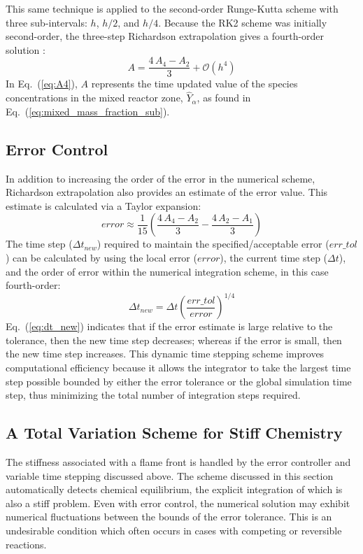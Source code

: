 This same technique is applied to the second-order Runge-Kutta scheme with three sub-intervals: $h$, $h/2$, and $h/4$. Because the RK2 scheme was initially second-order, the three-step Richardson extrapolation gives a fourth-order solution \cite{Moin:2001}:
\begin{equation}\label{eq:A4}
A=\frac{4\,A_4-A_2}{3}  + \mathcal{O}(h^4)
\end{equation}
In Eq.~(\ref{eq:A4}), $A$ represents the time updated value of the species concentrations in the mixed reactor zone, $\hat{Y}_{\alpha}$, as found in Eq.~(\ref{eq:mixed_mass_fraction_sub}).

\subsection*{Error Control}

In addition to increasing the order of the error in the numerical scheme, Richardson extrapolation also provides an estimate of the error value. This estimate is calculated via a Taylor expansion:
\begin{equation}\label{eq:error}
error \approx \frac{1}{15}\left(\frac{4\,A_4-A_2}{3} - \frac{4\,A_2-A_1}{3}\right)
\end{equation}
The time step ($\Delta t_{new}$) required to maintain the specified/acceptable error ($err\_tol$) can be calculated by using the local error ($error$), the current time step ($\Delta t$), and the order of error within the numerical integration scheme, in this case fourth-order:
\begin{equation}\label{eq:dt_new}
\Delta t_{new}=\Delta t \left(\frac{err\_tol}{error}\right)^{1/4}
\end{equation}
Eq.~(\ref{eq:dt_new}) indicates that if the error estimate is large relative to the tolerance, then the new time step decreases; whereas if the error is small, then the new time step increases. This dynamic time stepping scheme improves computational efficiency because it allows the integrator to take the largest time step possible bounded by either the error tolerance or the global simulation time step, thus minimizing the total number of integration steps required.

\subsection*{A Total Variation Scheme for Stiff Chemistry}

The stiffness associated with a flame front is handled by the error controller and variable time stepping discussed above. The scheme discussed in this section automatically detects chemical equilibrium, the explicit integration of which is also a stiff problem.  Even with error control, the numerical solution may exhibit numerical fluctuations between the bounds of the error tolerance.  This is an undesirable condition which often occurs in cases with competing or reversible reactions.

